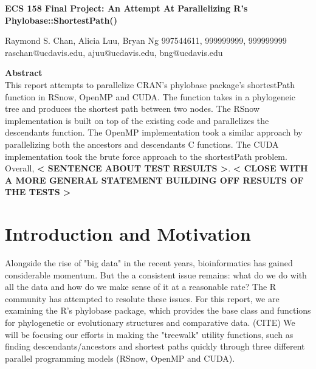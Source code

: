 \documentclass[11pt,letterpaper]{article}
\begin{document}
\begin{center}
{\huge \textbf{ECS 158 Final Project: An Attempt At Parallelizing R's Phylobase::ShortestPath()}\\
\vspace{5mm}
\begin{Large}
Raymond S. Chan, Alicia Luu, Bryan Ng
997544611, 999999999, 999999999\\
raschan@ucdavis.edu, ajuu@ucdavis.edu, bng@ucdavis.edu\\
\end{Large}}
\end{center}


\vspace{5mm}

\begin{center}
	\begin{large}
		\textbf{Abstract}\\
		This report attempts to parallelize CRAN's phylobase package's shortestPath function in RSnow, OpenMP and CUDA. The function takes in a phylogeneic tree and produces the shortest path between two nodes. The RSnow implementation is built on top of the existing code and parallelizes the descendants function. The OpenMP implementation took a similar approach by parallelizing both the ancestors and descendants C functions. The CUDA implementation took the brute force approach to the  shortestPath problem. Overall, \textbf{< SENTENCE ABOUT TEST RESULTS >}. \textbf{< CLOSE WITH A MORE GENERAL STATEMENT BUILDING OFF RESULTS OF THE TESTS >} 
	\end{large}
	

\end{center}

\section{Introduction and Motivation}
 
Alongside the rise of "big data" in the recent years, bioinformatics has gained considerable momentum. But the a consistent issue remains: what do we do with all the data and how do we make sense of it at a reasonable rate? The R community has attempted to resolute these issues. For this report, we are examining the R's phylobase package, which provides the base class and functions for phylogenetic or evolutionary structures and comparative data. (CITE) We will be focusing our efforts in making the "treewalk" utility functions, such as finding descendants/ancestors and shortest paths quickly through three different parallel programming models (RSnow, OpenMP and CUDA).  
\end{document}
